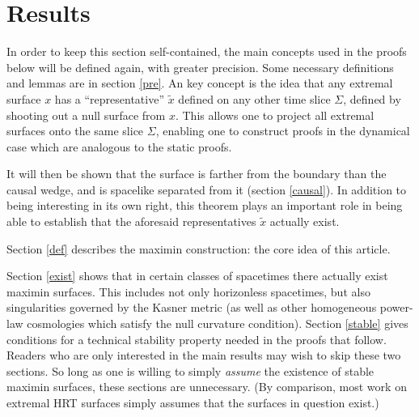 \documentclass{article}
\begin{document}


\section{Results}

In order to keep this section self-contained, the main concepts used in the proofs below will be defined again, with greater precision.  Some necessary definitions and lemmas are in section \ref{pre}.  An key concept is the idea that any extremal surface $x$ has a ``representative'' $\tilde{x}$ defined on any other time slice $\Sigma$, defined by shooting out a null surface from $x$.  This allows one to project all extremal surfaces onto the same slice $\Sigma$, enabling one to construct proofs in the dynamical case which are analogous to the static proofs.

It will then be shown that the surface is farther from the boundary than the causal wedge, and is spacelike separated from it (section \ref{causal}).  In addition to being interesting in its own right, this theorem plays an important role in being able to establish that the aforesaid representatives $\tilde{x}$ actually exist.

Section \ref{def} describes the maximin construction: the core idea of this article.

Section \ref{exist} shows that in certain classes of spacetimes there actually exist maximin surfaces.  This includes not only horizonless spacetimes, but also singularities governed by the Kasner metric (as well as other homogeneous power-law cosmologies which satisfy the null curvature condition).  Section \ref{stable} gives conditions for a technical stability property needed in the proofs that follow.  Readers who are only interested in the main results may wish to skip these two sections.  So long as one is willing to simply \emph{assume} the existence of stable maximin surfaces, these sections are unnecessary.  (By comparison, most work on extremal HRT surfaces simply assumes that the surfaces in question exist.)
\end{document}
